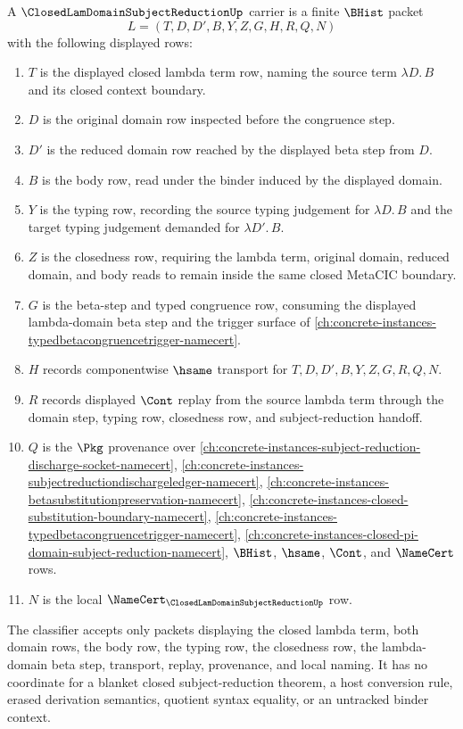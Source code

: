 \begin{definition}
\label{def:closed-lam-domain-subject-reduction-carrier}
A $\ClosedLamDomainSubjectReductionUp$ carrier is a finite $\BHist$ packet
$$
L=(T,D,D',B,Y,Z,G,H,R,Q,N)
$$
with the following displayed rows:
\begin{enumerate}
\item $T$ is the displayed closed lambda term row, naming the source term $\lambda D.\,B$ and its closed context boundary.
\item $D$ is the original domain row inspected before the congruence step.
\item $D'$ is the reduced domain row reached by the displayed beta step from $D$.
\item $B$ is the body row, read under the binder induced by the displayed domain.
\item $Y$ is the typing row, recording the source typing judgement for $\lambda D.\,B$ and the target typing judgement demanded for $\lambda D'.\,B$.
\item $Z$ is the closedness row, requiring the lambda term, original domain, reduced domain, and body reads to remain inside the same closed MetaCIC boundary.
\item $G$ is the beta-step and typed congruence row, consuming the displayed lambda-domain beta step and the trigger surface of \autoref{ch:concrete-instances-typedbetacongruencetrigger-namecert}.
\item $H$ records componentwise $\hsame$ transport for $T,D,D',B,Y,Z,G,R,Q,N$.
\item $R$ records displayed $\Cont$ replay from the source lambda term through the domain step, typing row, closedness row, and subject-reduction handoff.
\item $Q$ is the $\Pkg$ provenance over \autoref{ch:concrete-instances-subject-reduction-discharge-socket-namecert}, \autoref{ch:concrete-instances-subjectreductiondischargeledger-namecert}, \autoref{ch:concrete-instances-betasubstitutionpreservation-namecert}, \autoref{ch:concrete-instances-closed-substitution-boundary-namecert}, \autoref{ch:concrete-instances-typedbetacongruencetrigger-namecert}, \autoref{ch:concrete-instances-closed-pi-domain-subject-reduction-namecert}, $\BHist$, $\hsame$, $\Cont$, and $\NameCert$ rows.
\item $N$ is the local $\NameCert_{\ClosedLamDomainSubjectReductionUp}$ row.
\end{enumerate}
The classifier accepts only packets displaying the closed lambda term, both domain rows, the body row, the typing row, the closedness row, the lambda-domain beta step, transport, replay, provenance, and local naming. It has no coordinate for a blanket closed subject-reduction theorem, a host conversion rule, erased derivation semantics, quotient syntax equality, or an untracked binder context.
\end{definition}

